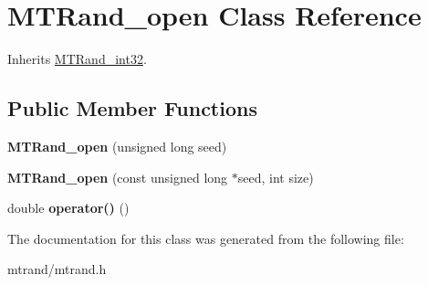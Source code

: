 \hypertarget{class_m_t_rand__open}{
\section{\-M\-T\-Rand\-\_\-open \-Class \-Reference}
\label{class_m_t_rand__open}
}


\-Inherits \hyperlink{class_m_t_rand__int32}{\-M\-T\-Rand\-\_\-int32}.

\subsection*{\-Public \-Member \-Functions}
\begin{DoxyCompactItemize}
\item 
\hypertarget{class_m_t_rand__open_a1f55ebc1052f5343f8d6e08a752ef957}{
{\bfseries \-M\-T\-Rand\-\_\-open} (unsigned long seed)}
\label{class_m_t_rand__open_a1f55ebc1052f5343f8d6e08a752ef957}

\item 
\hypertarget{class_m_t_rand__open_a0216992f4dfa5acf22ee8c585eeac488}{
{\bfseries \-M\-T\-Rand\-\_\-open} (const unsigned long $\ast$seed, int size)}
\label{class_m_t_rand__open_a0216992f4dfa5acf22ee8c585eeac488}

\item 
\hypertarget{class_m_t_rand__open_ac408aa400ca59fc2afc888d88f98d807}{
double {\bfseries operator()} ()}
\label{class_m_t_rand__open_ac408aa400ca59fc2afc888d88f98d807}

\end{DoxyCompactItemize}


\-The documentation for this class was generated from the following file\-:\begin{DoxyCompactItemize}
\item 
mtrand/mtrand.\-h\end{DoxyCompactItemize}
